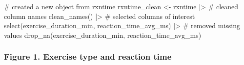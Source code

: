 \documentclass[
  letterpaper,
  DIV=11,
  numbers=noendperiod]{scrartcl}
\newenvironment{Shaded}{\begin{snugshade}}{\end{snugshade}}
\newcommand{\CommentTok}[1]{\textcolor[rgb]{0.37,0.37,0.37}{#1}}
\newcommand{\FunctionTok}[1]{\textcolor[rgb]{0.28,0.35,0.67}{#1}}
\newcommand{\NormalTok}[1]{\textcolor[rgb]{0.00,0.23,0.31}{#1}}
\newcommand{\OtherTok}[1]{\textcolor[rgb]{0.00,0.23,0.31}{#1}}
\newcommand{\SpecialCharTok}[1]{\textcolor[rgb]{0.37,0.37,0.37}{#1}}
\begin{document}
\begin{Shaded}
\begin{Highlighting}[]
\CommentTok{\# created a new object from rxntime}
\NormalTok{rxntime\_clean }\OtherTok{\textless{}{-}}\NormalTok{ rxntime }\SpecialCharTok{|\textgreater{}} 
  \CommentTok{\# cleaned column names}
 \FunctionTok{clean\_names}\NormalTok{() }\SpecialCharTok{|\textgreater{}} 
  \CommentTok{\# selected columns of interest}
  \FunctionTok{select}\NormalTok{(exercise\_duration\_min, reaction\_time\_avg\_ms) }\SpecialCharTok{|\textgreater{}}
  \CommentTok{\# removed missing values}
  \FunctionTok{drop\_na}\NormalTok{(exercise\_duration\_min, reaction\_time\_avg\_ms)}
\end{Highlighting}
\end{Shaded}

\subsubsection{Figure 1. Exercise type and reaction
time}\label{figure-1.-exercise-type-and-reaction-time}
\end{document}
